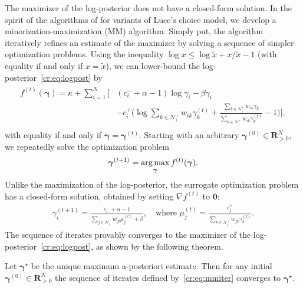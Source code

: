 The maximizer of the log-posterior does not have a closed-form solution.
In the spirit of the algorithms of \citet{hunter2004mm} for variants of Luce's choice model, we develop a minorization-maximization (MM) algorithm.
Simply put, the algorithm iteratively refines an estimate of the maximizer by solving a sequence of simpler optimization problems.
Using the inequality $\log x \le \log \tilde{x} + x/\tilde{x} - 1$ (with equality if and only if $x = \tilde{x}$), we can lower-bound the log-posterior~\eqref{cr:eq:logpost} by
\begin{align}
\label{cr:eq:minorizing}
\begin{aligned}
f^{(t)}(\bm{\gamma}) = \kappa + \sum_{i = 1}^N \bigg[
    & (c^-_i + \alpha - 1) \log \gamma_i - \beta \gamma_i \\
    &- c^+_i \bigg( \log\!\sum_{k \in \mathcal{N}^+_i}\!w_{ik} \gamma^{(t)}_k
                   +\frac{\sum_{k \in \mathcal{N}^+_i}\!w_{ik} \gamma_k}{\sum_{k \in \mathcal{N}^+_i}\!w_{ik} \gamma^{(t)}_k} -1 \bigg) \bigg],
\end{aligned}
\end{align}
with equality if and only if $\bm{\gamma} = \bm{\gamma}^{(t)}$.
Starting with an arbitrary $\bm{\gamma}^{(0)} \in \mathbf{R}^N_{>0}$, we repeatedly solve the optimization problem
\begin{align*}
\bm{\gamma}^{(t+1)} = \operatorname*{arg\,max}_{\bm{\gamma}} f^{(t)}(\bm{\gamma}).
\end{align*}
Unlike the maximization of the log-posterior, the surrogate optimization problem has a closed-form solution, obtained by setting $\nabla f^{(t)}$ to $\bm{0}$:
\begin{align}
\label{cr:eq:mmiter}
\gamma_i^{(t + 1)} = \frac{c^-_i + \alpha - 1}{\sum_{j \in \mathcal{N}^-_i} w_{ji} \mu_j^{(t)} + \beta},
    \quad \text{where }
    \mu_j^{(t)} = \frac{c^+_j}{\sum_{k \in \mathcal{N}^+_j} w_{jk} \gamma_k^{(t)}}.
\end{align}
The sequence of iterates provably converges to the maximizer of the log-posterior~\eqref{cr:eq:logpost}, as shown by the following theorem.

\begin{theorem}
\label{cr:thm:mmconv}
Let $\bm{\gamma}^\star$ be the unique maximum a-posteriori estimate.
Then for any initial $\bm{\gamma}^{(0)} \in \mathbf{R}^N_{> 0}$ the sequence of iterates defined by~\eqref{cr:eq:mmiter} converges to $\bm{\gamma}^\star$.
\end{theorem}


